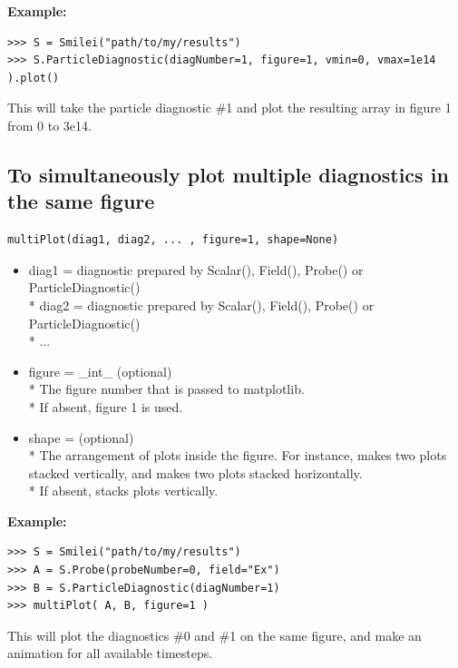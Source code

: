 \documentclass[11pt]{article}
\newcommand{\code}[1]{\colorbox{yellow!15}{\ttfamily #1}}
\begin{document}
\textbf{Example:}
\begin{lstlisting}
>>> S = Smilei("path/to/my/results")
>>> S.ParticleDiagnostic(diagNumber=1, figure=1, vmin=0, vmax=1e14 ).plot()
\end{lstlisting}
This will take the particle diagnostic \#1 and plot the resulting array in figure 1 from 0 to 3e14.
\clearpage


\subsection{To simultaneously plot multiple diagnostics in the same figure}
\begin{lstlisting}
multiPlot(diag1, diag2, ... , figure=1, shape=None)
\end{lstlisting}

\begin{itemize}
\item \code{diag1} = diagnostic prepared by \code{Scalar()}, \code{Field()}, \code{Probe()} or \code{ParticleDiagnostic()}\\*
	\code{diag2} = diagnostic prepared by \code{Scalar()}, \code{Field()}, \code{Probe()} or \code{ParticleDiagnostic()}\\*
	...

\item \code{figure} = \code{\_int\_}       (optional)\\*
	The figure number that is passed to matplotlib.\\*
	If absent, figure 1 is used.
	
\item \code{shape} = \code{[\_int\_ , \_int\_]}       (optional)\\*
	The arrangement of plots inside the figure. For instance, \code{[2, 1]} makes two plots stacked vertically, and \code{[1, 2]} makes two plots stacked horizontally.\\*
	If absent, stacks plots vertically.
\end{itemize}

\textbf{Example:}
\begin{lstlisting}
>>> S = Smilei("path/to/my/results")
>>> A = S.Probe(probeNumber=0, field="Ex")
>>> B = S.ParticleDiagnostic(diagNumber=1)
>>> multiPlot( A, B, figure=1 )
\end{lstlisting}

This will plot the diagnostics \#0 and \#1 on the same figure, and make an animation for all available timesteps.
\end{document}
